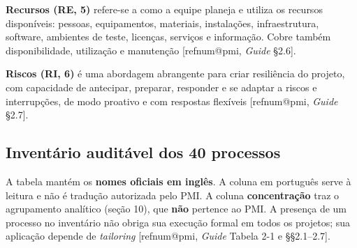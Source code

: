 \documentclass[11pt,a4paper]{article}
\makeatletter
\newcommand{\refnum}[1]{\csname refnum@#1\endcsname}
\makeatother
\begin{document}
\textbf{Recursos (RE, 5)} refere-se a como a equipe planeja e utiliza os recursos disponíveis: pessoas, equipamentos, materiais, instalações, infraestrutura, software, ambientes de teste, licenças, serviços e informação. Cobre também disponibilidade, utilização e manutenção [\refnum{pmi}, \textit{Guide} §2.6].

\textbf{Riscos (RI, 6)} é uma abordagem abrangente para criar resiliência do projeto, com capacidade de antecipar, preparar, responder e se adaptar a riscos e interrupções, de modo proativo e com respostas flexíveis [\refnum{pmi}, \textit{Guide} §2.7].
\subsection{Inventário auditável dos 40 processos}

A tabela mantém os \textbf{nomes oficiais em inglês}. A coluna em português serve à leitura e não é tradução autorizada pelo PMI. A coluna \textbf{concentração} traz o agrupamento analítico (seção 10), que \textbf{não} pertence ao PMI. A presença de um processo no inventário não obriga sua execução formal em todos os projetos; sua aplicação depende de \textit{tailoring} [\refnum{pmi}, \textit{Guide} Tabela 2-1 e §§2.1–2.7].
\end{document}
